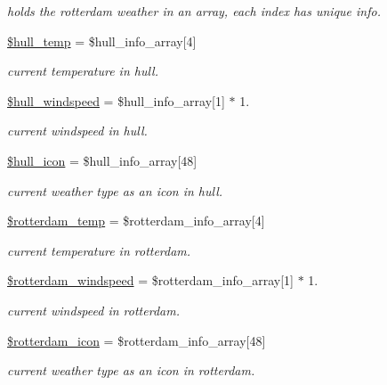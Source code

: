 \begin{DoxyCompactItemize}
\begin{DoxyCompactList}\small\item\em holds the rotterdam weather in an array, each index has unique info. \end{DoxyCompactList}\item 
\mbox{\hyperlink{index_8php_a0e5fa38b5556b79fc1dedc0611a0ac43}{\$hull\+\_\+temp}} = \$hull\+\_\+info\+\_\+array\mbox{[}4\mbox{]}
\begin{DoxyCompactList}\small\item\em current temperature in hull. \end{DoxyCompactList}\item 
\mbox{\hyperlink{index_8php_a157ea9ca0609284bf0acb10039e57ece}{\$hull\+\_\+windspeed}} = \$hull\+\_\+info\+\_\+array\mbox{[}1\mbox{]} $\ast$ 1.
\begin{DoxyCompactList}\small\item\em current windspeed in hull. \end{DoxyCompactList}\item 
\mbox{\hyperlink{index_8php_a21259db6d85456f627a1b906d8def681}{\$hull\+\_\+icon}} = \$hull\+\_\+info\+\_\+array\mbox{[}48\mbox{]}
\begin{DoxyCompactList}\small\item\em current weather type as an icon in hull. \end{DoxyCompactList}\item 
\mbox{\hyperlink{index_8php_a7d5783f258dc82ac9156c855be8f2d9a}{\$rotterdam\+\_\+temp}} = \$rotterdam\+\_\+info\+\_\+array\mbox{[}4\mbox{]}
\begin{DoxyCompactList}\small\item\em current temperature in rotterdam. \end{DoxyCompactList}\item 
\mbox{\hyperlink{index_8php_a9e1bd1fab9ba49731a47922e12661ef5}{\$rotterdam\+\_\+windspeed}} = \$rotterdam\+\_\+info\+\_\+array\mbox{[}1\mbox{]} $\ast$ 1.
\begin{DoxyCompactList}\small\item\em current windspeed in rotterdam. \end{DoxyCompactList}\item 
\mbox{\hyperlink{index_8php_a917dfb18ffe5dce2f66b78a2ab25bb2e}{\$rotterdam\+\_\+icon}} = \$rotterdam\+\_\+info\+\_\+array\mbox{[}48\mbox{]}
\begin{DoxyCompactList}\small\item\em current weather type as an icon in rotterdam. \end{DoxyCompactList}\item 

\end{DoxyCompactItemize}
